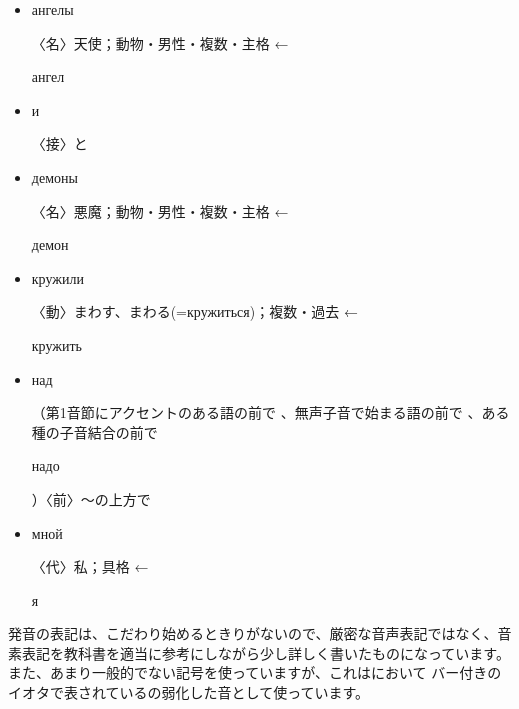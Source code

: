 \documentclass[12pt]{ltjsarticle}
\begin{document}
\begin{itemize}
\item \begin{russian}ангелы\end{russian} 〈名〉天使；動物・男性・複数・主格 ← \begin{russian}ангел\end{russian}
    \item \begin{russian}и\end{russian} 〈接〉と
    \item \begin{russian}демоны\end{russian} 〈名〉悪魔；動物・男性・複数・主格 ← \begin{russian}демон\end{russian} 
    \item \begin{russian}кружили\end{russian} 〈動〉まわす、まわる(=кружиться)；複数・過去 ← \begin{russian}кружить\end{russian}
    \item \begin{russian}над\end{russian} （第1音節にアクセントのある語の前で 、無声子音で始まる語の前で 、ある種の子音結合の前で \begin{russian}надо\end{russian} ）〈前〉〜の上方で
    \item \begin{russian}мной\end{russian} 〈代〉私；具格 ← \begin{russian}я\end{russian} 
\end{itemize}

\bigskip

発音の表記は、こだわり始めるときりがないので、厳密な音声表記ではなく、音素表記を教科書を適当に参考にしながら少し詳しく書いたものになっています。また、あまり一般的でない記号{\guilsinglleft}\textipa{{\textlowering{\textbari}}}{\guilsinglright}を使っていますが、これは\citep{jones2011}において バー付きのイオタで表されている\textipa{/{\textbari}/}の弱化した音として使っています。
\end{document}
